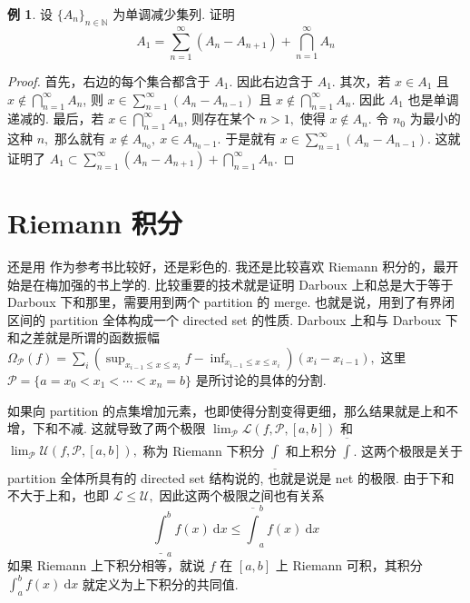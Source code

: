 \documentclass[12pt, a4paper, oneside]{book}
\numberwithin{figure}{section}
\theoremstyle{definition}
\newtheorem{example}[theorem]{例}
\begin{document}
\begin{example}
    设 $\{A_n\}_{n\in\mathbb N}$ 为单调减少集列. 证明 
    \begin{equation*}
        A_1=\sum_{n=1}^\infty (A_n-A_{n+1}) + \bigcap_{n=1}^\infty A_n
    \end{equation*}
\end{example}
\begin{proof}
首先，右边的每个集合都含于 $A_1.$ 因此右边含于 $A_1.$ 其次，若 $x\in A_1$ 且 $x\notin \bigcap_{n=1}^\infty A_n$, 则 $x\in \sum_{n=1}^\infty (A_n-A_{n-1})$ 且 $x\notin \bigcap_{n=1}^\infty A_n.$ 因此 $A_1$ 也是单调递减的. 最后，若 $x\in \bigcap_{n=1}^\infty A_n$, 则存在某个 $n>1,$ 使得 $x\notin A_n.$ 令 $n_0$ 为最小的这种 $n,$ 那么就有 $x\notin A_{n_0},\ x\in A_{n_0-1}.$ 于是就有 $x\in \sum_{n=1}^\infty (A_n-A_{n-1}).$ 这就证明了 
$A_1\subset \sum_{n=1}^\infty (A_n-A_{n+1}) + \bigcap_{n=1}^\infty A_n.$ 
\end{proof}

\section{Riemann 积分} 
还是用 \cite{Axler_2020} 作为参考书比较好，还是彩色的. 我还是比较喜欢 Riemann 积分的，最开始是在梅加强的书上学的. 比较重要的技术就是证明 Darboux 上和总是大于等于 Darboux 下和那里，需要用到两个 partition 的 merge. 也就是说，用到了有界闭区间的 partition 全体构成一个 directed set 的性质. Darboux 上和与 Darboux 下和之差就是所谓的函数振幅 
$\Omega_\mathcal P (f)=\sum_{i} (\sup_{x_{i-1}\leq x\leq x_i} f-\inf_{x_{i-1}\leq x\leq x_i})(x_i-x_{i-1}),$ 这里 $\mathcal P=\{a=x_0<x_1<\cdots<x_n=b\}$ 是所讨论的具体的分割. 

如果向 partition 的点集增加元素，也即使得分割变得更细，那么结果就是上和不增，下和不减. 这就导致了两个极限 $\lim_{\mathcal P} \mathcal L(f,\mathcal P,[a,b])$ 和 $\lim_{\mathcal P} \mathcal U(f,\mathcal P,[a,b]),$ 称为 Riemann 下积分 $\underline{\int}$ 和上积分 $\overline{\int}$. 这两个极限是关于 partition 全体所具有的 directed set 结构说的, 也就是说是 net 的极限. 由于下和不大于上和，也即 $\mathcal L\leq \mathcal U,$ 因此这两个极限之间也有关系
\begin{equation}
    \underline{\int}_a^b f(x)\ \mathrm dx\leq  \overline{\int}_a^b f(x)\ \mathrm dx
\end{equation}
如果 Riemann 上下积分相等，就说 $f$ 在 $[a,b]$ 上 Riemann 可积，其积分 $\int_a^b f(x)\ \mathrm dx$ 就定义为上下积分的共同值. 
\end{document}
